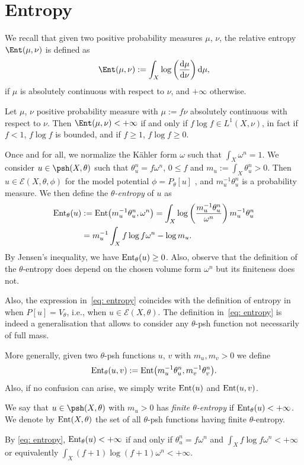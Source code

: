 \section{Entropy}
 We recall that given two positive probability measures $\mu$, $\nu$, the relative entropy $\Ent(\mu, \nu)$ is defined as
\[
\Ent(\mu, \nu) := \int_X \log\left (\frac{{\rm d}\mu}{{\rm d}\nu}\right) {\rm d}\mu,
\]
if $\mu$ is absolutely continuous with respect to $\nu$, and $+\infty$ otherwise.

\begin{Remark}
Let $\mu$, $\nu$ positive probability measure with $\mu := f \nu $ absolutely continuous with respect to $\nu$. Then $\Ent(\mu,\nu) < + \infty$ if and only if $f\log f \in L^1(X,\nu)$, in fact if $f < 1$, $f \log f$ is bounded, and if $f \geq 1$, $f \log f \geq 0$. \label{L^1}
\end{Remark}

Once and for all, we normalize the K\"ahler form $\omega$ such that $\int_X \omega^n=1$. We consider $u\in \psh(X, \theta)$ such that $\theta_u^n=f \omega^n$, $0 \leq f$ and $m_u:=\int_X \theta_u^n >0$. Then $ u\in \mathcal{E}(X, \theta, \phi)$ for the model potential $\phi=P_\theta[u]$ \cite[Theorem 1.3]{DDL2}, and $m_u^{-1}\theta_u^n$ is a probability measure. We then define the $\theta$\emph{-entropy} of $u$ as
\begin{align}
 {\rm Ent}_\theta(u)&:= {\rm Ent}\big( m_u^{-1}\theta_u^n, {\omega^n}\big)=\int_X \log \left( \frac{m_u^{-1}\theta_u^n}{\omega^n} \right) m_u^{-1}\theta_u^n\nonumber\\
 &= m_u^{-1} \int_X f\log f \omega^n-\log m_u.\label{eq: entropy}
 \end{align}
By Jensen’s inequality, we have ${\rm Ent}_\theta(u)\geq 0$. Also, observe that the definition of the $\theta$-entropy does depend on the chosen volume form $\omega^n$ but its finiteness does not.

Also, the expression in~\eqref{eq: entropy} coincides with the definition of entropy in \cite{DGL20} when $P[u]=V_\theta$, i.e., when $u\in \mathcal{E}(X, \theta)$. The definition in~\eqref{eq: entropy} is indeed a generalisation that allows to consider any $\theta$-psh function not necessarily of full mass.

More generally, given two $\theta$-psh functions $u$, $v$ with $m_u, m_v>0$ we define
\[{\rm Ent}_\theta(u,v) :={\rm Ent}\big( m_u^{-1}\theta_u^n, m_v^{-1}\theta_v^n\big). \]
Also, if no confusion can arise, we simply write ${\rm Ent} (u) $ and ${\rm Ent} (u,v) $.

\begin{Definition}\label{def: entropy}
 We say that $u\in \psh(X, \theta)$ with $m_u>0$ has \emph{finite $\theta$-entropy} if ${\rm Ent}_\theta(u)<+\infty$. We denote by ${\rm Ent}(X, \theta)$ the set of all $\theta$-psh functions having finite $\theta$-entropy.
\end{Definition}
 By \eqref{eq: entropy}, ${\rm Ent}_\theta(u)<+\infty$ if and only if $\theta_u^n=f\omega^n$ and $\int_X f\log f\omega^n<+\infty$ or equivalently $\int_X (f+1)\log (f+1)\omega^n<+\infty$.
